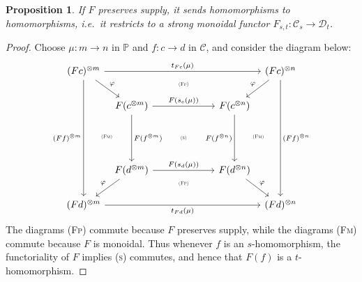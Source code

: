 \documentclass[11pt, oneside, article]{memoir}
\theoremstyle{plain}
\newtheorem{proposition}[theorem]{Proposition}
\theoremstyle{definition}
\theoremstyle{remark}
\newcommand{\cat}[1]{\mathcal{#1}}%
\newcommand{\tpow}[1]{^{\otimes #1}}
\newcommand{\pp}{\mathbb{P}}
\begin{document}
\begin{proposition}
If $F$ preserves supply, it sends homomorphisms to homomorphisms, i.e.\ it restricts to a strong monoidal functor $F_{s,t}\colon\cat{C}_s\to\cat{D}_t$.
\end{proposition}
\begin{proof}
Choose $\mu\colon m\to n$ in $\pp$ and $f\colon c\to d$ in $\cat{C}$, and consider the diagram below:
\[
\begin{tikzcd}[column sep=6pt]
	(Fc)\tpow{m}
		\ar[rrrr, "t_{Fc}(\mu)"]
		\ar[dddd, "(Ff)\tpow{m}"']
		\ar[dr, "\varphi"]
		&
    &[18pt] 
    \ar[d, phantom, near start,  "\textsc{\tiny (Fp)}"]
		&[18pt]
    &
  (Fc)\tpow{n}
		\ar[dddd, "(Ff)\tpow{n}"]
		\ar[dl, "\varphi"']
		\\
		&
	F(c\tpow{m})
		\ar[dd, "F(f\tpow{m})"]
    \ar[rr, "F(s_{c}(\mu))"]
    &
    ~
    &
	F(c\tpow{n})
    \ar[dd, "F(f\tpow{n})"']
    \\
    \ar[r, phantom,"\textsc{\tiny (Fm)}"]
    &~& 
    \textsc{\tiny (s)}
    &~&
    \ar[l, phantom,"\textsc{\tiny (Fm)}"]
		\\
		&
	F(d\tpow{m})
		\ar[rr, "F(s_d(\mu))"]
    \ar[dl, "\varphi"']
    &
    \ar[d, phantom, near start, "\textsc{\tiny (Fp)}"]
    &
	F(d\tpow{n})
    \ar[dr, "\varphi"]
    \\
	(Fd)\tpow{m}
		\ar[rrrr, "t_{Fd}(\mu)"']
		&&~&&
	(Fd)\tpow{n}
\end{tikzcd}
\]
The diagrams \textsc{(Fp)} commute because $F$ preserves supply, while the diagrams \textsc{(Fm)} commute because $F$ is monoidal. Thus whenever $f$ is an $s$-homomorphism, the functoriality of $F$ implies \textsc{(s)} commutes, and hence that $F(f)$ is a $t$-homomorphism.
\end{proof}
\end{document}
